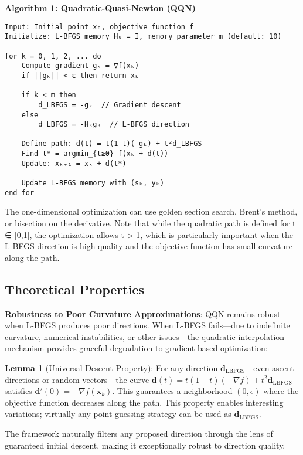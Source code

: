 \textbf{Algorithm 1: Quadratic-Quasi-Newton (QQN)}

\begin{verbatim}
Input: Initial point x₀, objective function f
Initialize: L-BFGS memory H₀ = I, memory parameter m (default: 10)

for k = 0, 1, 2, ... do
    Compute gradient gₖ = ∇f(xₖ)
    if ||gₖ|| < ε then return xₖ

    if k < m then
        d_LBFGS = -gₖ  // Gradient descent
    else
        d_LBFGS = -Hₖgₖ  // L-BFGS direction

    Define path: d(t) = t(1-t)(-gₖ) + t²d_LBFGS
    Find t* = argmin_{t≥0} f(xₖ + d(t))
    Update: xₖ₊₁ = xₖ + d(t*)

    Update L-BFGS memory with (sₖ, yₖ)
end for
\end{verbatim}

The one-dimensional optimization can use golden section search, Brent's method, or bisection on the derivative.
Note that while the quadratic path is defined for t ∈ {[}0,1{]}, the optimization allows t \textgreater{} 1, which is particularly important when the L-BFGS direction is high quality and the objective function has small curvature along the path.

\hypertarget{theoretical-properties}{%
\subsection{Theoretical Properties}\label{theoretical-properties}}

\textbf{Robustness to Poor Curvature Approximations}: QQN remains robust when L-BFGS produces poor directions.
When L-BFGS fails---due to indefinite curvature, numerical instabilities, or other issues---the quadratic interpolation mechanism provides graceful degradation to gradient-based optimization:

\textbf{Lemma 1} (Universal Descent Property): For any direction \(\mathbf{d}_{\text{LBFGS}}\)---even ascent directions or random vectors---the curve \(\mathbf{d}(t) = t(1-t)(-\nabla f) + t^2 \mathbf{d}_{\text{LBFGS}}\) satisfies \(\mathbf{d}'(0) = -\nabla f(\mathbf{x}_k)\).
This guarantees a neighborhood \((0, \epsilon)\) where the objective function decreases along the path.
This property enables interesting variations; virtually any point guessing strategy can be used as \(\mathbf{d}_{\text{LBFGS}}\).

The framework naturally filters any proposed direction through the lens of guaranteed initial descent, making it exceptionally robust to direction quality.

